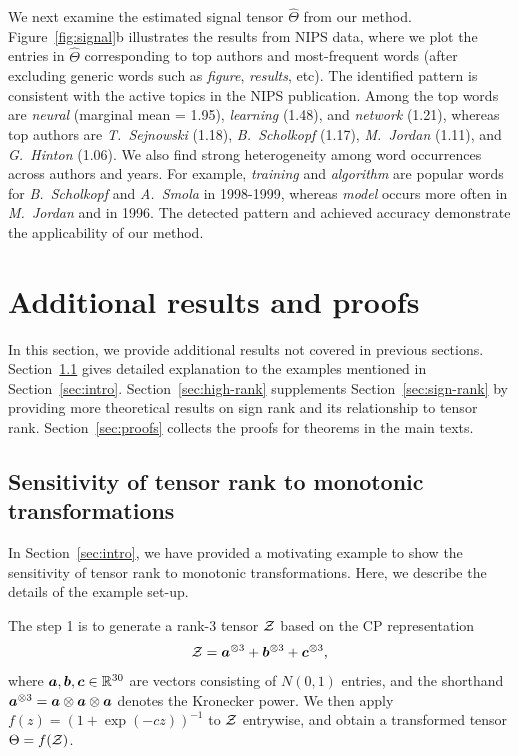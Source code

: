 \documentclass[11pt]{article}
\theoremstyle{plain}
\theoremstyle{definition}
\begin{document}
We next examine the estimated signal tensor $\hat \Theta$ from our method.  Figure~\ref{fig:signal}b illustrates the results from NIPS data, where we plot the entries in $\hat \Theta$ corresponding to top authors and most-frequent words (after excluding generic words such as \emph{figure}, \emph{results}, etc). The identified pattern is consistent with the active topics in the NIPS publication. Among the top words are \emph{neural} (marginal mean = 1.95), \emph{learning} (1.48), and \emph{network} (1.21), whereas top authors are \emph{T.\ Sejnowski} (1.18), \emph{B.~Scholkopf} (1.17), \emph{M.\ Jordan} (1.11), and \emph{G.\ Hinton} (1.06). We also find strong heterogeneity among word occurrences across authors and years. For example, \emph{training} and \emph{algorithm} are popular words for \emph{B.\ Scholkopf} and \emph{A.\ Smola} in 1998-1999, whereas \emph{model} occurs more often in \emph{M.\ Jordan} and in 1996. The detected pattern and achieved accuracy demonstrate the applicability of our method.



\section{Additional results and proofs}
In this section, we provide additional results not covered in previous sections. Section~\ref{sec:additional} gives detailed explanation to the examples mentioned in Section~\ref{sec:intro}. Section~\ref{sec:high-rank} supplements Section~\ref{sec:sign-rank} by providing more theoretical results on sign rank and its relationship to tensor rank. Section~\ref{sec:proofs} collects the proofs for theorems in the main texts. 


\subsection{Sensitivity of tensor rank to monotonic transformations}\label{sec:additional}
In Section~\ref{sec:intro}, we have provided a motivating example to show the sensitivity of tensor rank to monotonic transformations. Here, we describe the details of the example set-up. 

The step 1 is to generate a rank-3 tensor $\mathcal{Z}$ based on the CP representation
\[
\mathcal{Z}=\bm{a}^{\otimes 3}+\bm{b}^{\otimes 3}+\bm{c}^{\otimes 3},
\]
where $\bm{a},\bm{b},\bm{c}\in\mathbb{R}^{30}$ are vectors consisting of $N(0,1)$ entries, and the shorthand $\bm{a}^{\otimes 3}=\bm{a}\otimes \bm{a}\otimes \bm{a}$ denotes the Kronecker power. We then apply $f(z)=(1+\exp(-cz))^{-1}$ to $\mathcal{Z}$ entrywise, and obtain a transformed tensor $\Theta=f(\mathcal{Z})$. 
\end{document}
